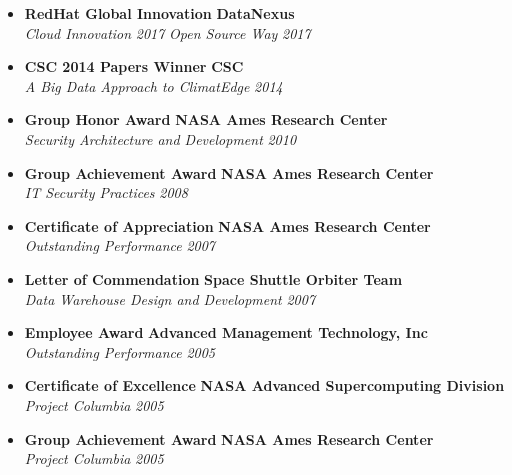\begin{itemize}
	\parskip=0.1em
	\item
	\headerrow
		{\textbf{RedHat Global Innovation}}
		{\textbf{DataNexus}}
	\\
	\headerrow
		{\emph{Cloud Innovation}}
		{\emph{2017}}
  \headerrow
		{\emph{Open Source Way}}
		{\emph{2017}}
  \item
	\headerrow
		{\textbf{CSC 2014 Papers Winner}}
		{\textbf{CSC}}
	\\
	\headerrow
		{\emph{A Big Data Approach to ClimatEdge\texttrademark}}
		{\emph{2014}}

	\item
	\headerrow
		{\textbf{Group Honor Award}}
		{\textbf{NASA Ames Research Center}}
	\\
	\headerrow
		{\emph{Security Architecture and Development}}
		{\emph{2010}}

	\item
	\headerrow
		{\textbf{Group Achievement Award}}
		{\textbf{NASA Ames Research Center}}
	\\
	\headerrow
		{\emph{IT Security Practices}}
		{\emph{2008}}

	\item
	\headerrow
		{\textbf{Certificate of Appreciation}}
		{\textbf{NASA Ames Research Center}}
	\\
	\headerrow
		{\emph{Outstanding Performance}}
		{\emph{2007}}

	\item
	\headerrow
		{\textbf{Letter of Commendation}}
		{\textbf{Space Shuttle Orbiter Team}}
	\\
	\headerrow
		{\emph{Data Warehouse Design and Development}}
		{\emph{2007}}

	\item
	\headerrow
		{\textbf{Employee Award}}
		{\textbf{Advanced Management Technology, Inc}}
	\\
	\headerrow
		{\emph{Outstanding Performance}}
		{\emph{2005}}

	\item
	\headerrow
		{\textbf{Certificate of Excellence}}
		{\textbf{NASA Advanced Supercomputing Division}}
	\\
	\headerrow
		{\emph{Project Columbia}}
		{\emph{2005}}

	\item
	\headerrow
		{\textbf{Group Achievement Award}}
		{\textbf{NASA Ames Research Center}}
	\\
	\headerrow
		{\emph{Project Columbia}}
		{\emph{2005}}


\end{itemize}
